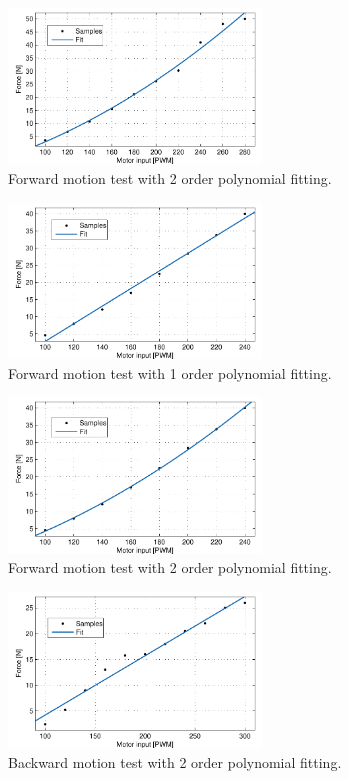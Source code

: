 \begin{figure}[htbp]
	\centering
	\includegraphics[width=0.6\textwidth]{plot/both_force_1_2order}
	\caption{Forward motion test with 2 order polynomial fitting.}
	\label{fig:1_2order}
\end{figure}

\begin{figure}[htbp]
	\centering
	\includegraphics[width=0.6\textwidth]{plot/both_force_2_1order}
	\caption{Forward motion test with 1 order polynomial fitting.}
	\label{fig:2_1order}
\end{figure}

\begin{figure}[htbp]
	\centering
	\includegraphics[width=0.6\textwidth]{plot/both_force_2_2order}
	\caption{Forward motion test with 2 order polynomial fitting.}
	\label{fig:2_2order}
\end{figure}

\begin{figure}[htbp]
	\centering
	\includegraphics[width=0.6\textwidth]{plot/both_force_3_1order}
	\caption{Backward motion test with 2 order polynomial fitting.}
	\label{fig:3_1order}
\end{figure}

